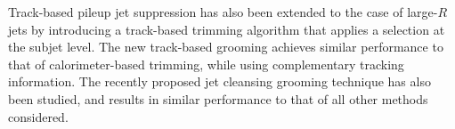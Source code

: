 \documentclass{atlasnote}
\begin{document}
Track-based pileup jet suppression has also been extended to the case
of large-$R$ jets by introducing a track-based trimming algorithm that applies a \cJVF selection at the subjet level. 
The new track-based grooming achieves similar performance to that of calorimeter-based trimming, while using complementary tracking information. The recently proposed jet cleansing 
grooming technique has also been studied, and results in similar performance to that of all other methods considered. 


 
\appendix







\end{document}
